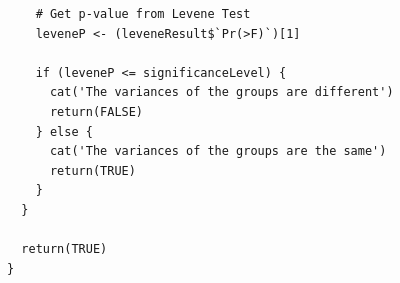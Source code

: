 \documentclass[12pt]{article}
\begin{document}
\begin{lstlisting}
    # Get p-value from Levene Test
    leveneP <- (leveneResult$`Pr(>F)`)[1]

    if (leveneP <= significanceLevel) {
      cat('The variances of the groups are different')
      return(FALSE)
    } else {
      cat('The variances of the groups are the same')
      return(TRUE)
    }
  }

  return(TRUE)
}
\end{lstlisting}
\end{document}
